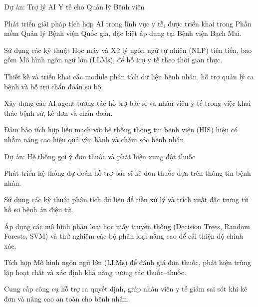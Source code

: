 \begin{cventries}

  \cventry
    {Dự án: Trợ lý AI Y tế cho Quản lý Bệnh viện}
    {}
    {
      \begin{cvitems}
        \item {Phát triển giải pháp tích hợp AI trong lĩnh vực y tế, được triển khai trong Phần mềm Quản lý Bệnh viện Quốc gia, đặc biệt áp dụng tại Bệnh viện Bạch Mai.}
        \item {Sử dụng các kỹ thuật Học máy và Xử lý ngôn ngữ tự nhiên (NLP) tiên tiến, bao gồm Mô hình ngôn ngữ lớn (LLMs), để hỗ trợ y tế theo thời gian thực.}
        \item {Thiết kế và triển khai các module phân tích dữ liệu bệnh nhân, hỗ trợ quản lý ca bệnh và hỗ trợ chẩn đoán sơ bộ.}
        \item {Xây dựng các AI agent tương tác hỗ trợ bác sĩ và nhân viên y tế trong việc khai thác bệnh sử, kê đơn và chẩn đoán.}
        \item {Đảm bảo tích hợp liền mạch với hệ thống thông tin bệnh viện (HIS) hiện có nhằm nâng cao hiệu quả vận hành và chăm sóc bệnh nhân.}
      \end{cvitems}
    }

\vspace{8pt}

  \cventry
    {Dự án: Hệ thống gợi ý đơn thuốc và phát hiện xung đột thuốc}
    {}
    {
      \begin{cvitems}
        \item {Phát triển hệ thống dự đoán hỗ trợ bác sĩ kê đơn thuốc dựa trên thông tin bệnh nhân.}
        \item {Sử dụng các kỹ thuật phân tích dữ liệu để tiền xử lý và trích xuất đặc trưng từ hồ sơ bệnh án điện tử.}
        \item {Áp dụng các mô hình phân loại học máy truyền thống (Decision Trees, Random Forests, SVM) và thử nghiệm các bộ phân loại nâng cao để cải thiện độ chính xác.}
        \item {Tích hợp Mô hình ngôn ngữ lớn (LLMs) để đánh giá đơn thuốc, phát hiện trùng lặp hoạt chất và xác định khả năng tương tác thuốc--thuốc.}
        \item {Cung cấp công cụ hỗ trợ ra quyết định, giúp nhân viên y tế giảm sai sót khi kê đơn và nâng cao an toàn cho bệnh nhân.}
      \end{cvitems}
    }

\end{cventries}

